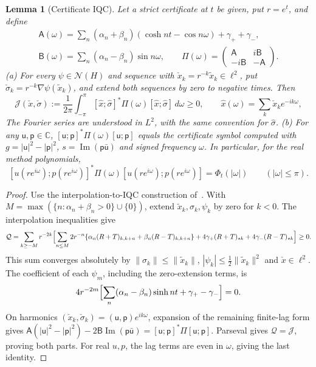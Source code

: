 \documentclass[11pt]{article}
\newtheorem{lemma}[theorem]{Lemma}
\theoremstyle{definition}
\theoremstyle{remark}
\newcommand{\C}{\mathbb C}
\newcommand{\cS}{\mathcal N}\newcommand{\Szero}{\mathcal S_0}
\newcommand{\ch}{\cosh}
\newcommand{\sh}{\sinh}
\newcommand{\Ima}{\operatorname{Im}}
\newcommand{\norm}[1]{\lVert #1\rVert}
\begin{document}
\begin{lemma}[Certificate IQC]\label{lem:iqc}
Let a strict certificate at \(t\) be given, put \(r=e^t\), and define
\[
\begin{gathered}
\mathsf A(\omega)=\sum_n(\alpha_n+\beta_n)(\ch nt-\cos n\omega)+\gamma_++\gamma_-,
\\
\mathsf B(\omega)=\sum_n(\alpha_n-\beta_n)\sin n\omega,\qquad
\Pi(\omega)=\begin{pmatrix}\mathsf A&i\mathsf B\\-i\mathsf B&-\mathsf A\end{pmatrix}.
\end{gathered}
\]
\textup{(a)} For every \(\psi\in\cS(H)\) and sequence with
\(\check x_k=r^{-k}\tilde x_k\in\ell^2\), put
\(\check\sigma_k=r^{-k}\nabla\psi(\tilde x_k)\), and extend both sequences
by zero to negative times.  Then
\[
\mathcal J(\check x,\check\sigma)
:=\frac{1}{2\pi}\int_{-\pi}^{\pi}
[\hat x;\hat\sigma]^*\Pi(\omega)[\hat x;\hat\sigma]\,d\omega\ge0,
\qquad \hat x(\omega)=\sum_k\check x_ke^{-ik\omega},
\]
The Fourier series are understood in \(L^2\), with the same convention for \(\hat\sigma\).
\textup{(b)} For any \(\mathsf u,\mathsf p\in\C\),
\([\mathsf u;\mathsf p]^*\Pi(\omega)[\mathsf u;\mathsf p]\)
equals the certificate symbol computed with
\(g=|\mathsf u|^2-|\mathsf p|^2\),
\(s=\Ima(\mathsf p\bar{\mathsf u})\) and signed frequency \(\omega\).
In particular, for the real method polynomials,
\[
[u(re^{i\omega});p(re^{i\omega})]^*\Pi(\omega)
[u(re^{i\omega});p(re^{i\omega})]=\Phi_t(|\omega|)\qquad(|\omega|\le\pi).
\]
\end{lemma}

\begin{proof}
Use the interpolation-to-IQC construction of~\cite[Lemma~D.4]{TA}.
With \(M=\max(\{n:\alpha_n+\beta_n>0\}\cup\{0\})\), extend
\(\tilde x_k,\sigma_k,\psi_k\) by zero for \(k<0\).  The interpolation inequalities give
\[
\mathcal Q=\sum_{k\ge-M}r^{-2k}\Bigl[
\sum_{n\le M}2r^{-n}\{\alpha_n(R+T)_{k,k+n}+\beta_n(R-T)_{k,k+n}\}
+4\gamma_+(R+T)_{\star k}+4\gamma_-(R-T)_{\star k}\Bigr]\ge0.
\]
This sum converges absolutely by \(\norm{\sigma_k}\le\norm{\tilde x_k}\),
\(|\psi_k|\le\frac12\norm{\tilde x_k}^2\) and \(\check x\in\ell^2\).
The coefficient of each \(\psi_m\), including the zero-extension terms, is
\[
4r^{-2m}\Bigl[\sum_n(\alpha_n-\beta_n)\sh nt+\gamma_+-\gamma_-\Bigr]=0.
\]
On harmonics \((\check x_k,\check\sigma_k)=(\mathsf u,\mathsf p)e^{ik\omega}\),
expansion of the remaining finite-lag form gives
\(\mathsf A(|\mathsf u|^2-|\mathsf p|^2)-2\mathsf B\Ima(\mathsf p\bar{\mathsf u})
=[\mathsf u;\mathsf p]^*\Pi[\mathsf u;\mathsf p]\).
Parseval gives \(\mathcal Q=\mathcal J\), proving both parts.
For real \(u,p\), the lag terms are even in \(\omega\), giving the last identity.
\end{proof}
\end{document}

